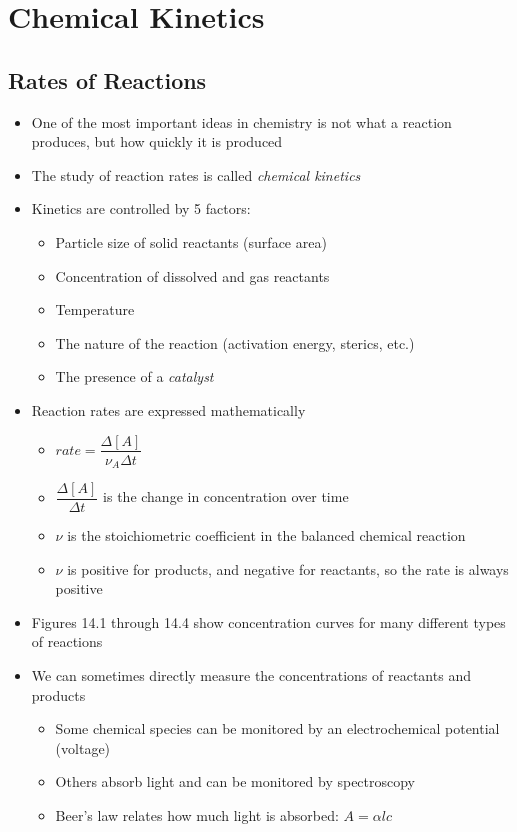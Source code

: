 \documentclass[12pt, openany, letterpaper]{memoir}
\begin{document}
\chapter{Chemical Kinetics}
\section{Rates of Reactions}
\begin{itemize}
	\item One of the most important ideas in chemistry is not what a reaction produces, but how quickly it is produced
	\item The study of reaction rates is called \emph{chemical kinetics}
	\item Kinetics are controlled by 5 factors:
	\begin{itemize}
		\item Particle size of solid reactants (surface area)
		\item Concentration of dissolved and gas reactants
		\item Temperature
		\item The nature of the reaction (activation energy, sterics, etc.)
		\item The presence of a \emph{catalyst}
	\end{itemize}
	\item Reaction rates are expressed mathematically
	\begin{itemize}
		\item $rate=\dfrac{\Delta\left[A\right]}{\nu_A\Delta t}$
		\item $\dfrac{\Delta\left[A\right]}{\Delta t}$ is the change in concentration over time
		\item $\nu$ is the stoichiometric coefficient in the balanced chemical reaction
		\item $\nu$ is positive for products, and negative for reactants, so the rate is always positive
	\end{itemize}
	\item Figures 14.1 through 14.4 show concentration curves for many different types of reactions
	\item We can sometimes directly measure the concentrations of reactants and products
	\begin{itemize}
		\item Some chemical species can be monitored by an electrochemical potential (voltage)
		\item Others absorb light and can be monitored by spectroscopy
		\item Beer's law relates how much light is absorbed: $A=\alpha lc$
	\end{itemize}
\end{itemize}
\end{document}
